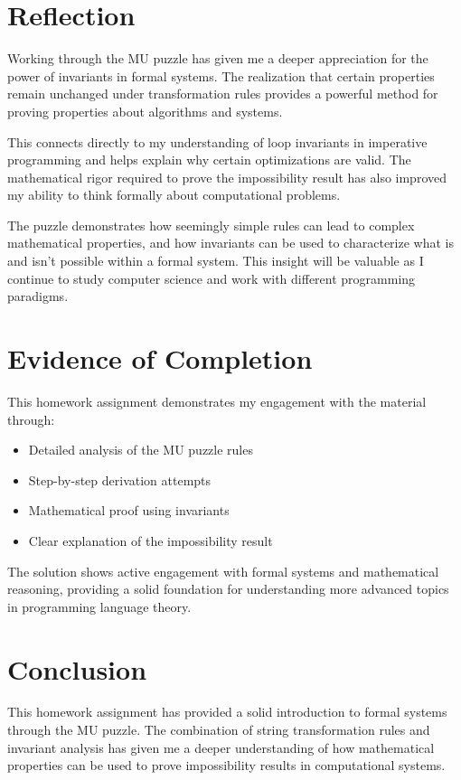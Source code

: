 \documentclass{article}
\theoremstyle{plain}
\theoremstyle{definition}
\theoremstyle{remark}
\begin{document}
\section{Reflection}

Working through the MU puzzle has given me a deeper appreciation for the power of invariants in formal systems. The realization that certain properties remain unchanged under transformation rules provides a powerful method for proving properties about algorithms and systems.

This connects directly to my understanding of loop invariants in imperative programming and helps explain why certain optimizations are valid. The mathematical rigor required to prove the impossibility result has also improved my ability to think formally about computational problems.

The puzzle demonstrates how seemingly simple rules can lead to complex mathematical properties, and how invariants can be used to characterize what is and isn't possible within a formal system. This insight will be valuable as I continue to study computer science and work with different programming paradigms.

\section{Evidence of Completion}

This homework assignment demonstrates my engagement with the material through:
\begin{itemize}
\item Detailed analysis of the MU puzzle rules
\item Step-by-step derivation attempts
\item Mathematical proof using invariants
\item Clear explanation of the impossibility result
\end{itemize}

The solution shows active engagement with formal systems and mathematical reasoning, providing a solid foundation for understanding more advanced topics in programming language theory.

\section{Conclusion}\label{conclusion}

This homework assignment has provided a solid introduction to formal systems through the MU puzzle. The combination of string transformation rules and invariant analysis has given me a deeper understanding of how mathematical properties can be used to prove impossibility results in computational systems.
\end{document}
